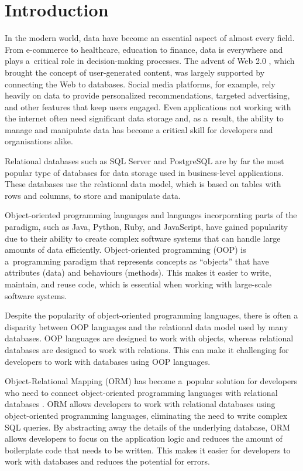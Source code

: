 \chapter{Introduction}

In the modern world, data have become an essential aspect of almost every field.
From e-commerce to healthcare, education to finance, data is everywhere and
plays a~critical role in decision-making processes. The advent of Web 2.0
\cite{Web2Oreilly}, which brought the concept of user-generated content, was
largely supported by connecting the Web to databases. Social media platforms,
for example, rely heavily on data to provide personalized recommendations,
targeted advertising, and other features that keep users engaged. Even
applications not working with the internet often need significant data storage
and, as a~result, the ability to manage and manipulate data has become a
critical skill for developers and organisations alike.

Relational databases such as SQL Server and PostgreSQL are by far the most
popular type of databases for data storage used in business-level applications.
These databases use the relational data model, which is based on tables with
rows and columns, to store and manipulate data.

Object-oriented programming languages and languages incorporating parts of the
paradigm, such as Java, Python, Ruby, and JavaScript, have gained
popularity \cite{stack-overflow-survey} due to their ability to create complex
software systems that can handle large amounts of data efficiently.
Object-oriented programming (OOP) is a~programming paradigm that represents
concepts as \enquote{objects} that have attributes (data) and behaviours
(methods). This makes it easier to write, maintain, and reuse code, which is
essential when working with large-scale software systems.

Despite the popularity of object-oriented programming languages, there is often
a disparity between OOP languages and the relational data model used by many
databases. OOP languages are designed to work with objects, whereas relational
databases are designed to work with relations. This can make it challenging for
developers to work with databases using OOP languages. 

Object-Relational Mapping (ORM) has become a~popular solution for developers who
need to connect object-oriented programming languages with relational databases
\cite{Torres_Galante_Pimenta_Martins_2017}. ORM allows developers to work with
relational databases using object-oriented programming languages, eliminating
the need to write complex SQL queries. By abstracting away the details of the
underlying database, ORM allows developers to focus on the application logic and
reduces the amount of boilerplate code that needs to be written. This makes it
easier for developers to work with databases and reduces the potential for
errors. 

